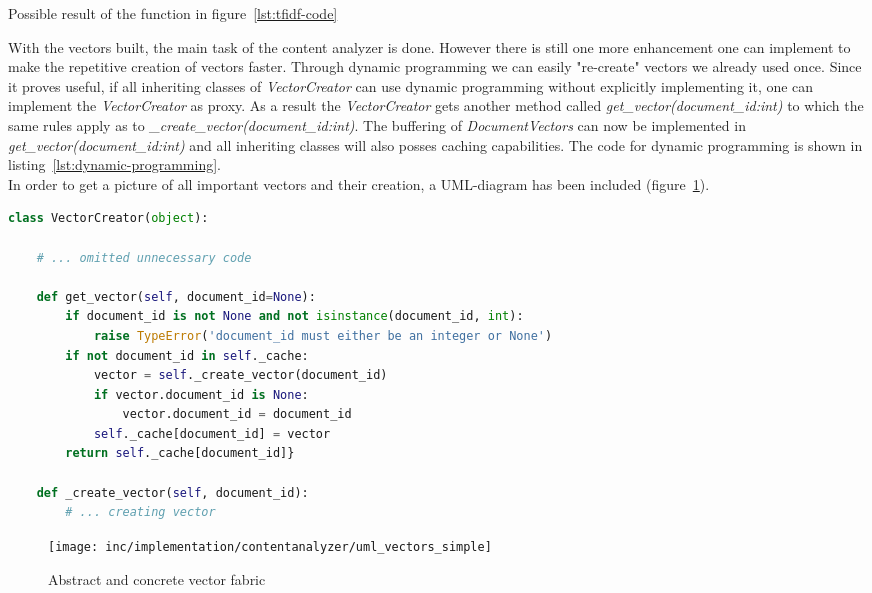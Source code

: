 \begin{table}
    \caption{Possible result of the function in figure~\ref{lst:tfidf-code}}
    \label{tab:tfidf-query-result}
\end{table}


With the vectors built, the main task of the content analyzer is done.
However there is still one more enhancement one can implement to make the repetitive creation of vectors faster.
Through \gls{dynamic programming} we can easily "re-create" vectors we already used once.
Since it proves useful, if all inheriting classes of \textit{VectorCreator} can use dynamic programming without explicitly implementing it, one can implement the \textit{VectorCreator} as \gls{proxy}.
As a result the \textit{VectorCreator} gets another method called \textit{get\_vector(document\_id:int)} to which the same rules apply as to \textit{\_create\_vector(document\_id:int)}.
The buffering of \textit{DocumentVectors} can now be implemented in \textit{get\_vector(document\_id:int)} and all inheriting classes will also posses caching capabilities.
The code for dynamic programming is shown in listing~\ref{lst:dynamic-programming}.\\
In order to get a picture of all important vectors and their creation, a UML-diagram has been included (figure~\ref{fig:uml-vectorssimple}).

\begin{lstlisting}[language=Python,caption={Dynamic programming},label={lst:dynamic-programming},float=h]
class VectorCreator(object):

    # ... omitted unnecessary code

    def get_vector(self, document_id=None):
        if document_id is not None and not isinstance(document_id, int):
            raise TypeError('document_id must either be an integer or None')
        if not document_id in self._cache:
            vector = self._create_vector(document_id)
            if vector.document_id is None:
                vector.document_id = document_id
            self._cache[document_id] = vector
        return self._cache[document_id]}

    def _create_vector(self, document_id):
        # ... creating vector
\end{lstlisting}


\begin{figure}[h]
    \center
    \texttt{[image: inc/implementation/contentanalyzer/uml\_vectors\_simple]}
    \caption{Abstract and concrete vector fabric}
    \label{fig:uml-vectorssimple}
\end{figure}
